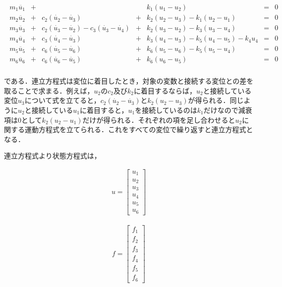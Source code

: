 \begin{eqnarray}
    \begin{matrix}
        m_1 \ddot{u_1} &+&  & & k_1 (u_1 - u_2) &=& 0 \\ 
        m_2 \ddot{u_2} &+& c_2(\dot{u_2} - \dot{u_3}) &+& k_2 (u_2 - u_3) - k_1 (u_2 - u_1) &=& 0 \\ 
        m_3 \ddot{u_3} &+& c_2(\dot{u_3} - \dot{u_2}) - c_3(\dot{u_3} - \dot{u_4}) &+& k_2 (u_3 - u_2) - k_3 (u_3 - u_4) &=& 0 \\ 
        m_4 \ddot{u_4} &+& c_3(\dot{u_4} - \dot{u_3}) &+& k_3 (u_4 - u_3) - k_5 (u_4 - u_5) - k_4 u_4 &=& 0 \\ 
        m_5 \ddot{u_5} &+& c_6(\dot{u_5} - \dot{u_6}) &+& k_6 (u_5 - u_6) - k_5 (u_5 - u_4) &=& 0 \\
        m_6 \ddot{u_6} &+& c_6(\dot{u_6} - \dot{u_5}) &+& k_6 (u_6 - u_5) &=& 0 \\
    \end{matrix}        
\end{eqnarray}

である．連立方程式は変位に着目したとき，対象の変数と接続する変位との差を取ることで求まる．例えば，$u_2$の$c_2$及び$k_2$に着目するならば，$u_2$と接続している変位$u_3$について式を立てると，$c_2(\dot{u_2} - \dot{u_3})$と$k_2(u_2 - u_3)$が得られる．同じように$u_2$と接続している$u_1$に着目すると，$u_1$を接続しているのは$k_1$だけなので減衰項は$0$として$k_2(u_2 - u_1)$だけが得られる．それぞれの項を足し合わせると$u_2$に関する運動方程式を立てられる．これをすべての変位で繰り返すと連立方程式となる．

連立方程式より状態方程式は，

\begin{eqnarray}
    u = 
    \begin{bmatrix}
        u_1 \\
        u_2 \\
        u_3 \\
        u_4 \\
        u_5 \\
        u_6 
    \end{bmatrix}
\end{eqnarray}

\begin{eqnarray}
    f = 
    \begin{bmatrix}
        f_1 \\
        f_2 \\
        f_3 \\
        f_4 \\
        f_5 \\
        f_6 
    \end{bmatrix}
\end{eqnarray}

